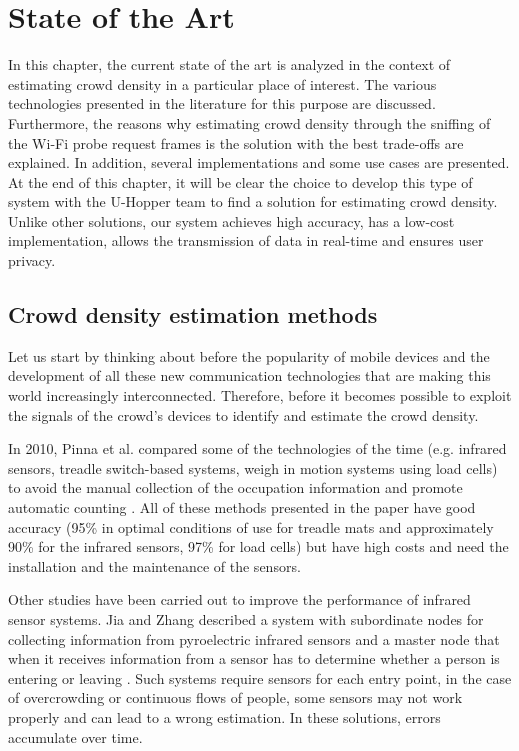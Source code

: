 \chapter{State of the Art}
\label{cha:soa}
\vspace{0.4 cm} 

In this chapter, the current state of the art is analyzed in the context of estimating crowd density in a particular place of interest. The various technologies presented in the literature for this purpose are discussed. Furthermore, the reasons why estimating crowd density through the sniffing of the Wi-Fi probe request frames is the solution with the best trade-offs are explained. In addition, several implementations and some use cases are presented.
At the end of this chapter, it will be clear the choice to develop this type of system with the U-Hopper team to find a solution for estimating crowd density. Unlike other solutions, our system achieves high accuracy, has a low-cost implementation, allows the transmission of data in real-time and ensures user privacy.


\section{Crowd density estimation methods}
\label{sec:count}
\vspace{0.2 cm} 

Let us start by thinking about before the popularity of mobile devices and the development of all these new communication technologies that are making this world increasingly interconnected. Therefore, before it becomes possible to exploit the signals of the crowd's devices to identify and estimate the crowd density.

In 2010, Pinna et al. compared some of the technologies of the time (e.g. infrared sensors, treadle switch-based systems, weigh in motion systems using load cells) to avoid the manual collection of the occupation information and promote automatic counting \cite{pinna2010automatic}. All of these methods presented in the paper have good accuracy (95\% in optimal conditions of use for treadle mats and approximately 90\% for the infrared sensors, 97\% for load cells) but have high costs and need the installation and the maintenance of the sensors.

Other studies have been carried out to improve the performance of infrared sensor systems. Jia and Zhang described a system with subordinate nodes for collecting information from pyroelectric infrared sensors and a master node that when it receives information from a sensor has to determine whether a person is entering or leaving \cite{jia2015application}.
Such systems require sensors for each entry point, in the case of overcrowding or continuous flows of people, some sensors may not work properly and can lead to a wrong estimation. In these solutions, errors accumulate over time.

